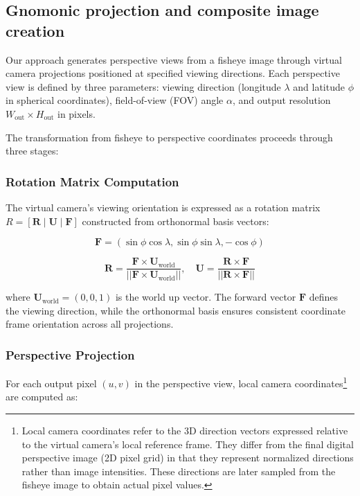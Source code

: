 \documentclass[twocolumn]{svjour3}          %
\begin{document}
\subsection{Gnomonic projection and composite image creation}
\label{sec:gnomonic_projection}

Our approach generates perspective views from a fisheye image through virtual camera projections positioned at specified viewing directions. Each perspective view is defined by three parameters: viewing direction (longitude $\lambda$ and latitude $\phi$ in spherical coordinates), field-of-view (FOV) angle $\alpha$, and output resolution $W_{\text{out}} \times H_{\text{out}}$ in pixels.

The transformation from fisheye to perspective coordinates proceeds through three stages:

\subsubsection{Rotation Matrix Computation}
\label{sec:rotation_matrix}

The virtual camera's viewing orientation is expressed as a rotation matrix $R = [\mathbf{R} \; | \; \mathbf{U} \; | \; \mathbf{F}]$ constructed from orthonormal basis vectors:

\begin{equation}
	\mathbf{F} = (\sin\phi\cos\lambda, \sin\phi\sin\lambda, -\cos\phi)
	\label{eq:forward_vector}
\end{equation}

\begin{equation}
	\mathbf{R} = \frac{\mathbf{F} \times \mathbf{U}_{\text{world}}}{||\mathbf{F} \times \mathbf{U}_{\text{world}}||}, \quad \mathbf{U} = \frac{\mathbf{R} \times \mathbf{F}}{||\mathbf{R} \times \mathbf{F}||}
	\label{eq:basis_vectors}
\end{equation}

where $\mathbf{U}_{\text{world}} = (0, 0, 1)$ is the world up vector. The forward vector $\mathbf{F}$ defines the viewing direction, while the orthonormal basis ensures consistent coordinate frame orientation across all projections.

\subsubsection{Perspective Projection}
\label{sec:perspective_projection}

For each output pixel $(u, v)$ in the perspective view, local camera coordinates\footnote{Local camera coordinates refer to the 3D direction vectors expressed relative to the virtual camera's local reference frame. They differ from the final digital perspective image (2D pixel grid) in that they represent normalized directions rather than image intensities. These directions are later sampled from the fisheye image to obtain actual pixel values.} are computed as:
\end{document}

